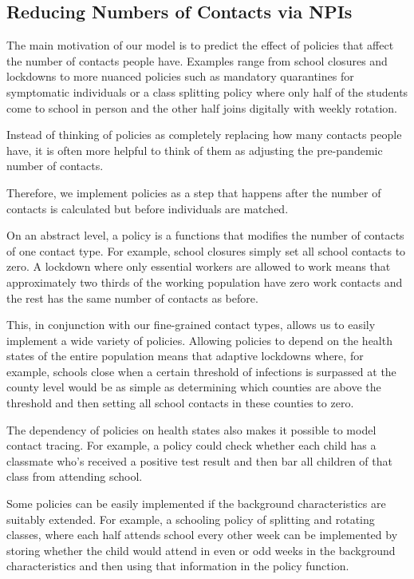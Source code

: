 \subsection{Reducing Numbers of Contacts via NPIs}
\label{sec:policies}

The main motivation of our model is to predict the effect of policies that affect the
number of contacts people have. Examples range from school closures and lockdowns to
more nuanced policies such as mandatory quarantines for symptomatic individuals or a
class splitting policy where only half of the students come to school in person and the
other half joins digitally with weekly rotation.

Instead of thinking of policies as completely replacing how many contacts people have,
it is often more helpful to think of them as adjusting the pre-pandemic number of
contacts.

Therefore, we implement policies as a step that happens after the number of contacts is
calculated but before individuals are matched.

On an abstract level, a policy is a functions that modifies the number of contacts of
one contact type. For example, school closures simply set all school contacts to zero. A
lockdown where only essential workers are allowed to work means that approximately two
thirds of the working population have zero work contacts and the rest has the same
number of contacts as before.

This, in conjunction with our fine-grained contact types, allows us to easily implement
a wide variety of policies. Allowing policies to depend on the health states of the
entire population means that adaptive lockdowns where, for example, schools close when a
certain threshold of infections is surpassed at the county level would be as simple as
determining which counties are above the threshold and then setting all school contacts
in these counties to zero.

The dependency of policies on health states also makes it possible to model contact
tracing. For example, a policy could check whether each child has a classmate who's
received a positive test result and then bar all children of that class from attending
school.

Some policies can be easily implemented if the background characteristics are suitably
extended. For example, a schooling policy of splitting and rotating classes,
where each half attends school every other week can be implemented by storing
whether the child would attend in even or odd weeks in the background characteristics
and then using that information in the policy function.

